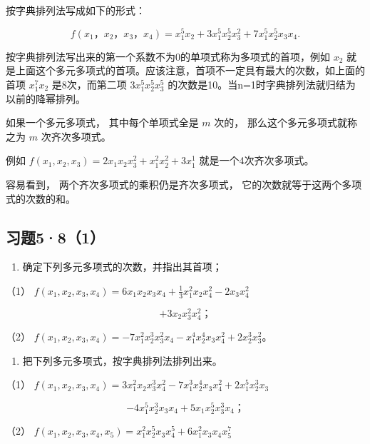 按字典排列法写成如下的形式：

\[
f \left(x _ {1}\text{，} x _ {2}\text{，} x _ {3}\text{，} x _ {4}\right) = x _ {1} ^ {5} x _ {2} + 3 x _ {1} ^ {5} x _ {2} ^ {5} x _ {3} ^ {2} + 7 x _ {1} ^ {5} x _ {2} ^ {5} x _ {3} x _ {4}.
\]

按字典排列法写出来的第一个系数不为0的单项式称为多项式的首项，例如
\(x_{2}\)
就是上面这个多元多项式的首项。应该注意，首项不一定具有最大的次数，如上面的首项
\(x_{1}^{7}x_{2}\) 是8次，而第二项 \(3x_{1}^{5}x_{2}^{5}x_{3}^{5}\)
的次数是10。当n=1时字典排列法就归结为以前的降幂排列。

如果一个多元多项式， 其中每个单项式全是 \(m\) 次的，
那么这个多元多项式就称之为 \(m\) 次齐次多项式。

例如
\(f(x_{1}, x_{2}, x_{3}) = 2x_{1}x_{2}x_{3}^{2} + x_{1}^{2}x_{2}^{2} + 3x_{1}^{1}\)
就是一个4次齐次多项式。

容易看到， 两个齐次多项式的乘积仍是齐次多项式，
它的次数就等于这两个多项式的次数的和。

\subsection{习题5·8（1）}

\begin{enumerate}
\item
  确定下列多元多项式的次数，并指出其首项；
\end{enumerate}

（1）
\(f(x_{1},x_{2},x_{3},x_{4}) = 6x_{1}x_{2}x_{3}x_{4} + \frac{1}{3} x_{1}^{2}x_{2}x_{4}^{2} - 2x_{3}x_{4}^{2}\)

\[
+ 3 x _ {2} x _ {3} ^ {2} x _ {4} ^ {2}\text{；}
\]

（2）
\(f(x_{1}, x_{2}, x_{3}, x_{4}) = -7x_{1}^{2}x_{2}^{3}x_{3}^{2}x_{4} - x_{1}^{4}x_{2}^{4}x_{3}x_{4}^{2} + 2x_{2}^{3}x_{3}^{2}\)。

\begin{enumerate}[start=2]
\item
  把下列多元多项式，按字典排列法排列出来。
\end{enumerate}

（1）
\(f(x_{1}, x_{2}, x_{3}, x_{4}) = 3x_{1}^{2}x_{2}x_{3}^{3}x_{4}^{2} - 7x_{1}^{3}x_{2}^{4}x_{3}x_{4}^{2} + 2x_{1}^{5}x_{2}^{3}x_{3}\)

\[
- 4 x _ {1} ^ {5} x _ {2} ^ {3} x _ {3} x _ {4} + 5 x _ {1} x _ {2} ^ {5} x _ {3} ^ {3} x _ {4}\text{；}
\]

（2）
\(f(x_{1}, x_{2}, x_{3}, x_{4}, x_{5}) = x_{1}^{2}x_{2}^{5}x_{3}x_{4}^{5} + 6x_{1}^{2}x_{3}x_{4}x_{5}^{7}\)

